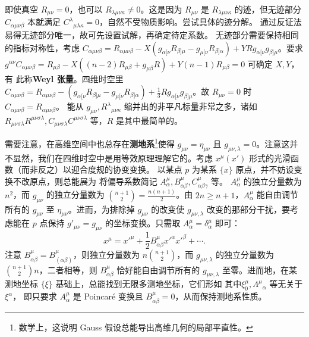 即使真空 $R_{\mu\nu}=0$，也可以 $R_{\lambda\mu\nu\kappa}\ne 0$。这是因为 $R_{\mu\nu}$ 是 $R_{\lambda\mu\nu\kappa}$ 的迹，但无迹部分 $C_{\alpha\mu\nu\beta}$ 本就满足 $C^\lambda{}_{\mu\lambda\kappa}=0$，自然不受物质影响。尝试具体的迹分解。
通过反证法易得无迹部分唯一，故可先设置试解，再确定待定系数。
无迹部分需要保持相同的指标对称性，考虑 $C_{\alpha\mu\nu\beta} = R_{\alpha\mu\nu\beta} - X(g_{\alpha[\nu} R_{\beta]\mu} - g_{\mu[\nu} R_{\beta]\alpha}) + Y R g_{\alpha[\nu} g_{\beta]\mu}$。要求 $g^{\alpha\nu}C_{\alpha\mu\nu\beta} = R_{\mu\beta} - X((n-2)R_{\mu\beta}+g_{\mu\beta} R) + Y(n-1)R_{\mu\beta} = 0$ 可确定 $X,Y$，有
此称\textbf{Weyl 张量}。四维时空里 $C_{\alpha\mu\nu\beta} = R_{\alpha\mu\nu\beta} - (g_{\alpha[\nu} R_{\beta]\mu} - g_{\mu[\nu} R_{\beta]\alpha}) + \frac13 R g_{\alpha[\nu} g_{\beta]\mu}$。故 $R_{\mu\nu}=0$ 时 $C_{\alpha\mu\nu\beta}=R_{\alpha\mu\nu\beta}$。
能从 $g_{\mu\nu},R^\lambda{}_{\mu\nu\kappa}$ 缩并出的非平凡标量非常之多，诸如 $R_{\mu\nu\sigma\lambda}R^{\mu\nu\sigma\lambda},C_{\mu\nu\sigma\lambda}C^{\mu\nu\sigma\lambda}$ 等，$R$ 是其中最简单的。



需要注意，在高维空间中也总存在\textbf{测地系}\footnote{数学上，这说明 Gauss 假设总能导出高维几何的局部平直性。}使得 $g_{\mu\nu}=\eta_{\mu\nu}$ 且 $g_{\mu\nu,\lambda}=0$。注意这并不显然，我们在四维时空中是用等效原理理解它的。考虑 $x^\mu(x')$ 形式的光滑函数（而非反之）以迎合度规的协变变换。
以某点 $p$ 为某系 $\{x\}$ 原点，并不妨设变换不改原点，则总能展为
将偏导系数简记 $A^\mu_\alpha,B^\mu_{\alpha\beta},C^\mu_{\alpha\beta\gamma}$ 等。
$A^\mu_\alpha$ 的独立分量数为 $n^2$，而 $g_{\mu\nu}$ 的独立分量数为 $\binom {n+1}{2}=\frac{n(n+1)}{2}$。由 $2n\geqslant n+1$，$A^\mu_\alpha$ 能自由调节所有的 $g_{\mu\nu}$ 至 $\eta_{\mu\nu}$。进而，为排除掉 $g_{\mu\nu}$ 的改变使 $g_{\mu\nu,\lambda}$ 改变的那部分干扰，要考虑能在 $p$ 点保持 $g'_{\mu\nu}= g_{\mu\nu}$ 的坐标变换。只需取 $A^\mu_\alpha=\delta^\mu_\alpha$ 即可：
\[x^\mu=x'^\mu+\frac 12 B^\mu_{\alpha\beta} x'^\alpha x'^\beta +\cdots.\]
注意 $B^\mu_{\alpha\beta}=B^\mu_{(\alpha\beta)}$，则独立分量数为 $n\binom {n+1}{2}$，而 $g_{\mu\nu,\lambda}$ 的独立分量数为 $\binom {n+1}{2}n$，二者相等，则 $B^\mu_{\alpha\beta}$ 恰好能自由调节所有的 $g_{\mu\nu,\lambda}$ 至零。进而地，在某测地坐标 $\{\xi\}$ 基础上，总能找到无限多测地坐标，它们形如
其中$\xi^\mu_0,\Lambda^\mu{}_\alpha$ 等无关于 $\xi^\alpha$，
即只要求 $A^\mu_\alpha$ 是 Poincaré 变换且 $B^\mu_{\alpha\beta}=0$，从而保持测地系性质。


